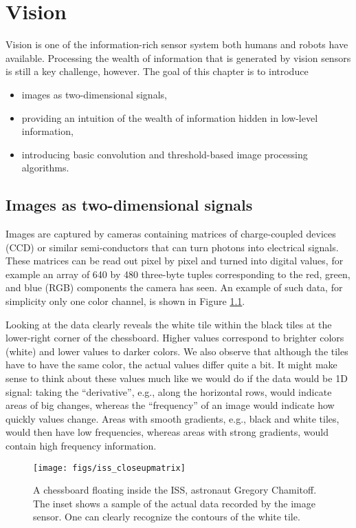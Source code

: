 \chapter{Vision}\label{chap:vision}
Vision is one of the information-rich sensor system both humans and robots have available. Processing the wealth of information that is generated by vision sensors is still a key challenge, however. The goal of this chapter is to introduce
\begin{itemize}
\item images as two-dimensional signals,
\item providing an intuition of the wealth of information hidden in low-level information,
\item introducing basic convolution and threshold-based image processing algorithms.
\end{itemize}

\section{Images as two-dimensional signals}
Images are captured by cameras containing matrices of charge-coupled devices (CCD) or similar semi-conductors that can turn photons into electrical signals. These matrices can be read out pixel by pixel and turned into digital values, for example an array of 640 by 480 three-byte tuples corresponding to the red, green, and blue (RGB) components the camera has seen. An example of such data, for simplicity only one color channel, is shown in Figure \ref{fig:iss_closeup}. 

Looking at the data clearly reveals the white tile within the black tiles at the lower-right corner of the chessboard. Higher values correspond to brighter colors (white) and lower values to darker colors. We also observe that although the tiles have to have the same color, the actual values differ quite a bit. It might make sense to think about these values much like we would do if the data would be 1D signal: taking the ``derivative'', e.g., along the horizontal rows, would indicate areas of big changes, whereas the ``frequency'' of an image  would indicate how quickly values change. Areas with smooth gradients, e.g., black and white tiles, would then have low frequencies, whereas areas with strong gradients, would contain high frequency information. 

\begin{figure}[!htb]
	\centering
		\texttt{[image: figs/iss\_closeupmatrix]}
	\caption{A chessboard floating inside the ISS, astronaut Gregory Chamitoff. The inset shows a sample of the actual data recorded by the image sensor. One can clearly recognize the contours of the white tile.}
	\label{fig:iss_closeup}
\end{figure}

